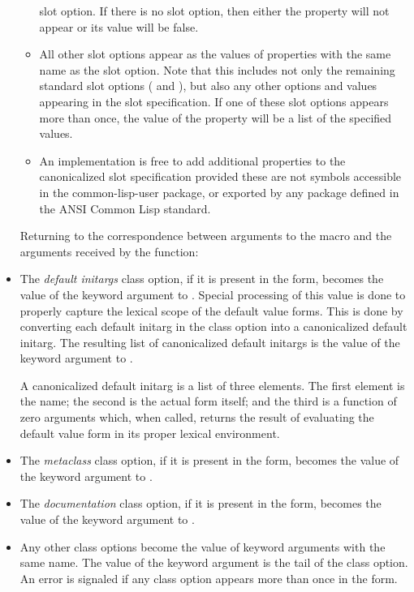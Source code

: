 \begin{itemize}
\begin{itemize}
         slot option. If there is no  slot option,
        then either the  property will not appear or its value
        will be false. 
      \item 
        All other slot options appear as the values of properties with the same
        name as the slot option. Note that this includes not only the remaining
        standard slot options ( and ), but also any other
        options and values appearing in the slot specification. If one of these
        slot options appears more than once, the value of the property will be a
        list of the specified values. 
      \item 
        An implementation is free to add additional properties to the
        canonicalized slot specification provided these are not symbols
        accessible in the common-lisp-user package, or exported by any package
        defined in the ANSI Common Lisp standard.  
      \end{itemize}

    Returning to the correspondence between arguments to the  macro and
    the arguments received by the  function: 

    \item 
    The \emph{default initargs} class option, if it is present in the  form,
    becomes the value of the  keyword argument to
    . Special processing of this value is done to properly capture
    the lexical scope of the default value forms. This is done by converting
    each default initarg in the class option into a canonicalized default
    initarg. The resulting list of canonicalized default initargs is the value
    of the  keyword argument to . 

    A canonicalized default initarg is a list of three elements. The first
    element is the name; the second is the actual form itself; and the third is
    a function of zero arguments which, when called, returns the result of
    evaluating the default value form in its proper lexical environment. 

  \item 
    The \emph{metaclass} class option, if it is present in the  form, becomes
    the value of the  keyword argument to . 

  \item 
    The \emph{documentation} class option, if it is present in the  form,
    becomes the value of the  keyword argument to . 

  \item 
    Any other class options become the value of keyword arguments with the same
    name. The value of the keyword argument is the tail of the class option. An
    error is signaled if any class option appears more than once in the 
    form. 
  \end{itemize}


